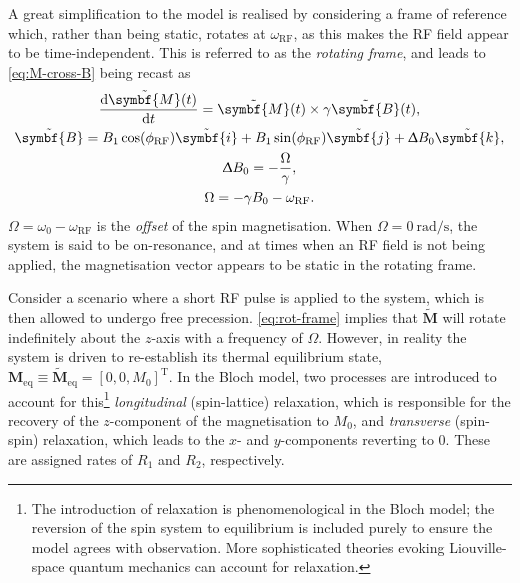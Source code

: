 A great simplification to the model is realised by considering a frame
of reference which, rather than being static, rotates at $\omega_{\text{RF}}$,
as this makes the \ac{RF} field appear to be time-independent. This is referred
to as the \emph{rotating frame}, and leads to \eqref{eq:M-cross-B} being recast
as
\begin{subequations}
    \begin{gather}
        \frac{\mathrm{d}\tilde{\symbf{M}}(t)}{\mathrm{d}t} = \tilde{\symbf{M}}(t) \times \gamma \tilde{\symbf{B}}(t),\\
        \tilde{\symbf{B}} =
            B_1 \cos(\phi_{\text{RF}}) \tilde{\symbf{i}} +
            B_1 \sin(\phi_{\text{RF}}) \tilde{\symbf{j}} +
            \Updelta B_0 \tilde{\symbf{k}},\\
        \Updelta B_0 = -\frac{\Omega}{\gamma},\\
        \Omega = -\gamma B_0 - \omega_{\text{RF}}.
    \end{gather}
    \label{eq:rot-frame}
\end{subequations}
$\Omega = \omega_0 - \omega_{\text{RF}}$ is the \emph{offset} of the spin
magnetisation. When $\Omega = \qty{0}{\radian\per\second}$, the system is said to
be on-resonance, and at times when an \ac{RF} field is not being applied, the
magnetisation vector appears to be static in the rotating frame.

Consider a scenario where a short \ac{RF} pulse is applied to the system, which
is then allowed to undergo free precession. \eqref{eq:rot-frame} implies that
$\tilde{\symbf{M}}$ will rotate indefinitely about the $z$-axis with a
frequency of $\Omega$. However, in reality the system is driven to re-establish
its thermal equilibrium state, $\symbf{M}_{\text{eq}} \equiv
\tilde{\symbf{M}}_{\text{eq}} = [0, 0, M_0]^{\mathrm{T}}$. In the
Bloch model, two processes are introduced to account for this\footnote{
    The introduction of relaxation is phenomenological in the Bloch model; the
    reversion of the spin system to equilibrium is included purely to ensure
    the model agrees with observation. More sophisticated theories evoking
    Liouville-space quantum mechanics can account for
    relaxation\cite{Goldman2001,Kuprov2007}.
}
\emph{longitudinal} (spin-lattice)
relaxation, which is responsible for the recovery of the $z$-component of the
magnetisation to $M_0$, and \emph{transverse} (spin-spin) relaxation, which
leads to the  $x$- and  $y$-components reverting to $0$. These are assigned
rates of $R_1$ and  $R_2$, respectively.

